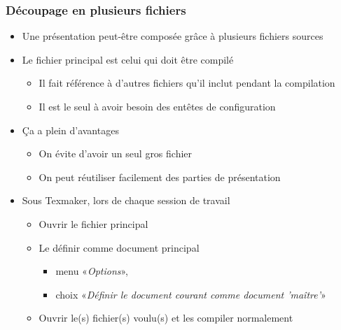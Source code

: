 \begin{frame}
  \frametitle{Découpage en plusieurs fichiers}

  \begin{itemize}
  \item Une présentation peut-être composée grâce à plusieurs fichiers sources
  \item Le fichier principal est celui qui doit être compilé

    \begin{itemize}
    \item Il fait référence à d'autres fichiers qu'il inclut pendant la compilation
    \item Il est le seul à avoir besoin des entêtes de configuration
    \end{itemize}

  \item Ça a plein d'avantages

    \begin{itemize}
    \item On évite d'avoir un seul gros fichier
    \item On peut réutiliser facilement des parties de présentation 
    \end{itemize}

    \pause

  \item Sous Texmaker, lors de chaque session de travail

    \begin{itemize}
    \item Ouvrir le fichier principal
    \item Le définir comme document principal

      \begin{itemize}
      \item menu «\emph{Options}»,
      \item choix «\emph{Définir le document courant comme document 'maître'}»
      \end{itemize}

    \item Ouvrir le(s) fichier(s) voulu(s) et les compiler normalement
    \end{itemize}

  \end{itemize}
\end{frame}

